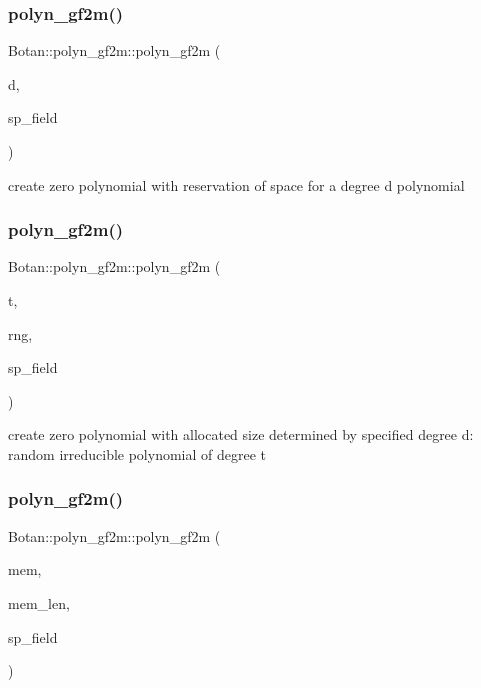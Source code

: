 \subsubsection{\texorpdfstring{polyn\+\_\+gf2m()}{polyn\_gf2m()}\hspace{0.1cm}{\footnotesize\ttfamily [2/5]}}
{\footnotesize\ttfamily Botan\+::polyn\+\_\+gf2m\+::polyn\+\_\+gf2m (\begin{DoxyParamCaption}\item[{int}]{d,  }\item[{std\+::shared\+\_\+ptr$<$ G\+F2m\+\_\+\+Field $>$}]{sp\+\_\+field }\end{DoxyParamCaption})}

create zero polynomial with reservation of space for a degree d polynomial \mbox{\label{class_botan_1_1polyn__gf2m_a249c5142d1c1ba263f863ed5f92ba319}} 
\subsubsection{\texorpdfstring{polyn\+\_\+gf2m()}{polyn\_gf2m()}\hspace{0.1cm}{\footnotesize\ttfamily [3/5]}}
{\footnotesize\ttfamily Botan\+::polyn\+\_\+gf2m\+::polyn\+\_\+gf2m (\begin{DoxyParamCaption}\item[{int}]{t,  }\item[{Random\+Number\+Generator \&}]{rng,  }\item[{std\+::shared\+\_\+ptr$<$ G\+F2m\+\_\+\+Field $>$}]{sp\+\_\+field }\end{DoxyParamCaption})}

create zero polynomial with allocated size determined by specified degree d\+: random irreducible polynomial of degree t \mbox{\label{class_botan_1_1polyn__gf2m_af9619fa1c8180c0e729d883a89ea3ffc}} 
\subsubsection{\texorpdfstring{polyn\+\_\+gf2m()}{polyn\_gf2m()}\hspace{0.1cm}{\footnotesize\ttfamily [4/5]}}
{\footnotesize\ttfamily Botan\+::polyn\+\_\+gf2m\+::polyn\+\_\+gf2m (\begin{DoxyParamCaption}\item[{const uint8\+\_\+t $\ast$}]{mem,  }\item[{uint32\+\_\+t}]{mem\+\_\+len,  }\item[{std\+::shared\+\_\+ptr$<$ G\+F2m\+\_\+\+Field $>$}]{sp\+\_\+field }\end{DoxyParamCaption})}

